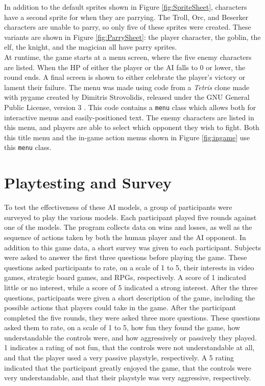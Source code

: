 In addition to the default sprites shown in Figure \ref{fig:SpriteSheet}, characters have a second sprite for when they are parrying. The Troll, Orc, and Beserker characters are unable to parry, so only five of these sprites were created. These variants are shown in Figure \ref{fig:ParrySheet}: the player character, the goblin, the elf, the knight, and the magician all have parry sprites.\\

At runtime, the game starts at a menu screen, where the five enemy characters are listed. When the HP of either the player or the AI falls to 0 or lower, the round ends. A final screen is shown to either celebrate the player's victory or lament their failure. The menu was made using code from a \textit{Tetris} clone made with pygame created by Dimitris Strovolidis, released under the GNU General Public License, version 3 \cite{tetris}. This code contains a \texttt{menu} class which allows both for interactive menus and easily-positioned text. The enemy characters are listed in this menu, and players are able to select which opponent they wish to fight. Both this title menu and the in-game action menus shown in Figure \ref{fig:ingame} use this \texttt{menu} class.

\section{Playtesting and Survey}
To test the effectiveness of these AI models, a group of participants were surveyed to play the various models. Each participant played five rounds against one of the models. The program collects data on wins and losses, as well as the sequence of actions taken by both the human player and the AI opponent. In addition to this game data, a short survey was given to each participant. Subjects were asked to answer the first three questions before playing the game. These questions asked participants to rate, on a scale of 1 to 5, their interests in video games, strategic board games, and RPGs, respectively. A score of 1 indicated little or no interest, while a score of 5 indicated a strong interest. After the three questions, participants were given a short description of the game, including the possible actions that players could take in the game. After the participant completed the five rounds, they were asked three more questions. These questions asked them to rate, on a scale of 1 to 5, how fun they found the game, how understandable the controls were, and how aggressively or passively they played. 1 indicates a rating of not fun, that the controls were not understandable at all, and that the player used a very passive playstyle, respectively. A 5 rating indicated that the participant greatly enjoyed the game, that the controls were very understandable, and that their playstyle was very aggressive, respectively.\\

